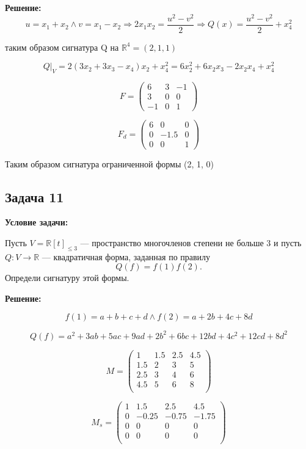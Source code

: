 \documentclass[a4paper,12pt]{article}
\begin{document}
\textbf{Решение:}
\[
u = x_1 + x_2 \land v = x_1 - x_2 \Rightarrow 2x_1x_2 = \frac{u^2-v^2}{2} \Rightarrow Q(x) = \frac{u^2-v^2}{2} + x_4^2
\]

таким образом сигнатура Q на $\mathbb{R}^4 = (2, 1, 1)$

\[
Q|_V = 2(3x_2 + 3x_3 - x_4)x_2 + x_4^2 = 6x_2^2 + 6x_2x_3 - 2x_2x_4 + x_4^2
\]

\[
F = 
\begin{pmatrix}
6 & 3 & -1 \\
3 & 0 & 0 \\
-1 & 0 & 1
\end{pmatrix}
\]

\[
F_d = 
\begin{pmatrix}
6 & 0 & 0 \\
0 & -1.5 & 0 \\
0 & 0 & 1
\end{pmatrix}
\]

Таким образом сигнатура ограниченной формы (2, 1, 0)

\vspace{1cm}

\subsection{Задача 11}
\textbf{Условие задачи:}

Пусть $V = \mathbb{R}[t]_{\leq 3}$ — пространство многочленов степени не больше 3 и пусть $Q: V \to \mathbb{R}$ — квадратичная форма, заданная по правилу
$$
Q(f) = f(1)f(2).
$$
Определи сигнатуру этой формы.

\textbf{Решение:}

\[
f(1) = a + b + c + d \land f(2) = a + 2b + 4c + 8d
\]

\[
Q(f)=a^2+3ab+5ac+9ad+2b ^2+6bc+12bd+4c^2+12cd+8d^2
\]

\[
M = \begin{pmatrix}
1 & 1.5 & 2.5 & 4.5 \\
1.5 & 2 & 3 & 5 \\
2.5 & 3 & 4 & 6 \\
4.5 & 5 & 6 & 8 \\
\end{pmatrix}
\]

\[
M_s =
\begin{pmatrix}
1 & 1.5 & 2.5 & 4.5 \\
0 & -0.25 & -0.75 & -1.75 \\
0 & 0 & 0 & 0 \\
0 & 0 & 0 & 0 \\
\end{pmatrix}
\]
\end{document}
